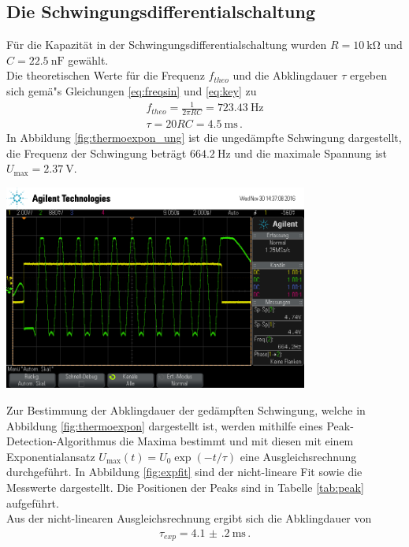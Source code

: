 \documentclass[]{scrartcl}
\begin{document}
\subsection{Die Schwingungsdifferentialschaltung}
Für die Kapazität in der Schwingungsdifferentialschaltung wurden $R=\SI{10}{\kilo\ohm}$ und \\ $C=\SI{22.5}{\nano\farad}$ gewählt. \\
Die theoretischen Werte für die Frequenz $f_{theo}$ und die Abklingdauer $\tau$ ergeben sich gemä"s Gleichungen \ref{eq:freqsin} und \ref{eq:key} zu
\begin{align}
f_{theo} = \frac{1}{2\pi RC}=\SI{723.43}{\hertz} \\
\tau = 20RC=\SI{4.5}{\milli\second}\,.
\end{align}
In Abbildung \ref{fig:thermoexpon_ung} ist die ungedämpfte Schwingung dargestellt, die Frequenz der Schwingung beträgt $\SI{664.2}{\hertz}$ und die maximale Spannung ist $U_{\text{max}}=\SI{2.37}{\volt}$.
\begin{center}
	\includegraphics[width=10cm]{images/schwingung.png}
	\label{fig:thermoexpon_ung}
\end{center}
Zur Bestimmung der Abklingdauer der gedämpften Schwingung, welche in Abbildung \ref{fig:thermoexpon} dargestellt ist, werden mithilfe eines Peak-Detection-Algorithmus die Maxima bestimmt und mit diesen mit einem Exponentialansatz $U_{\text{max}}(t)=U_0\exp\left(-t/\tau\right) $ eine Ausgleichsrechnung durchgeführt. In Abbildung \ref{fig:expfit} sind der nicht-lineare Fit sowie die Messwerte dargestellt. Die Positionen der Peaks sind in Tabelle \ref{tab:peak} aufgeführt.\\
Aus der nicht-linearen Ausgleichsrechnung ergibt sich die Abklingdauer von
\begin{align*}
\tau_{exp}=\SI{4.1(2)}{\milli\second}\,.
\end{align*}
\end{document}
